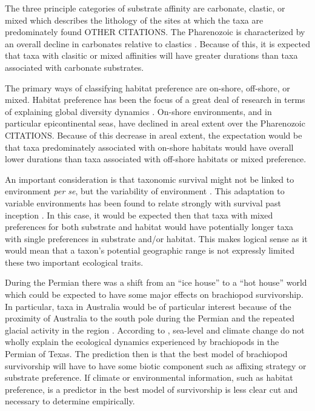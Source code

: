 \documentclass[12pt,letterpaper]{article}
\begin{document}
The three principle categories of substrate affinity are carbonate, clastic, or mixed which describes the lithology of the sites at which the taxa are predominately found \citep{Foote2006} OTHER CITATIONS. The Pharenozoic is characterized by an overall decline in carbonates relative to clastics \citep{Foote2006,Miller2001}. Because of this, it is expected that taxa with clasitic or mixed affinities will have greater durations than taxa associated with carbonate substrates. %

The primary ways of classifying habitat preference are on-shore, off-shore, or mixed. Habitat preference has been the focus of a great deal of research in terms of explaining global diversity dynamics \citep{Sepkoski1991}. On-shore environments, and in particular epicontinental seas, have declined in areal extent over the Pharenozoic CITATIONS. Because of this decrease in areal extent, the expectation would be that taxa predominately associated with on-shore habitats would have overall lower durations than taxa associated with off-shore habitats or mixed preference.

An important consideration is that taxonomic survival might not be linked to environment \textit{per se}, but the variability of environment \citep{Foote2013,Heim2011}. This adaptation to variable environments has been found to relate strongly with survival past inception \citep{Foote2013}. In this case, it would be expected then that taxa with mixed preferences for both substrate and habitat would have potentially longer taxa with single preferences in substrate and/or habitat. This makes logical sense as it would mean that a taxon's potential geographic range is not expressly limited these two important ecological traits.

During the Permian there was a shift from an ``ice house'' to a ``hot house'' world \citep{Fielding2006,Birgenheier2010,Jones2006,Powell2007} which could be expected to have some major effects on brachiopod survivorship. In particular, taxa in Australia would be of particular interest because of the proximity of Australia to the south pole during the Permian and the repeated glacial activity in the region \citep{Fielding2006,Birgenheier2010,Jones2006}. According to \citet{Olszewski2004}, sea-level and climate change do not wholly explain the ecological dynamics experienced by brachiopods in the Permian of Texas. The prediction then is that the best model of brachiopod survivorship will have to have some biotic component such as affixing strategy or substrate preference. If climate or environmental information, such as habitat preference, is a predictor in the best model of survivorship is less clear cut and necessary to determine empirically.
\end{document}
